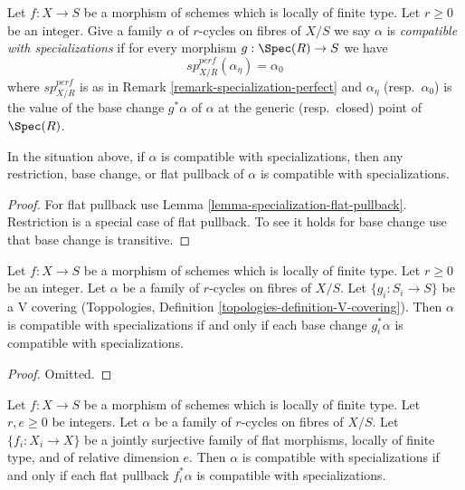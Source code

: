 \noindent
Let $f : X \to S$ be a morphism of schemes which is locally of finite type.
Let $r \geq 0$ be an integer. Give a family $\alpha$ of $r$-cycles on fibres
of $X/S$ we say $\alpha$ is {\it compatible with specializations} if
for every morphism $g : \Spec(R) \to S$ we have
$$
sp_{X/R}^{perf}(\alpha_\eta) = \alpha_0
$$
where $sp_{X/R}^{perf}$ is as in Remark \ref{remark-specialization-perfect}
and $\alpha_\eta$ (resp.\ $\alpha_0$) is the value of the base change
$g^*\alpha$ of $\alpha$ at the generic (resp.\ closed) point of $\Spec(R)$.

\begin{lemma}
\label{lemma-families-specialization}
In the situation above, if $\alpha$ is compatible with specializations,
then any restriction, base change, or flat pullback of $\alpha$ is compatible
with specializations.
\end{lemma}

\begin{proof}
For flat pullback use Lemma \ref{lemma-specialization-flat-pullback}.
Restriction is a special case of flat pullback. To see it holds for
base change use that base change is transitive.
\end{proof}

\begin{lemma}
\label{lemma-families-specialization-V-descent}
Let $f : X \to S$ be a morphism of schemes which is locally of finite type.
Let $r \geq 0$ be an integer. Let $\alpha$ be a family of $r$-cycles on fibres
of $X/S$. Let $\{g_i : S_i \to S\}$ be a V covering (Toppologies, Definition
\ref{topologies-definition-V-covering}). Then $\alpha$ is compatible
with specializations if and only if each base change $g_i^*\alpha$
is compatible with specializations.
\end{lemma}

\begin{proof}
Omitted.
\end{proof}

\begin{lemma}
\label{lemma-families-specialization-fppf-descent}
Let $f : X \to S$ be a morphism of schemes which is locally of finite type.
Let $r, e \geq 0$ be integers. Let $\alpha$ be a family of $r$-cycles on fibres
of $X/S$. Let $\{f_i : X_i \to X\}$ be a jointly surjective family
of flat morphisms, locally of finite type, and of relative dimension $e$.
Then $\alpha$ is compatible with specializations if and only if each flat
pullback $f_i^*\alpha$ is compatible with specializations.
\end{lemma}

